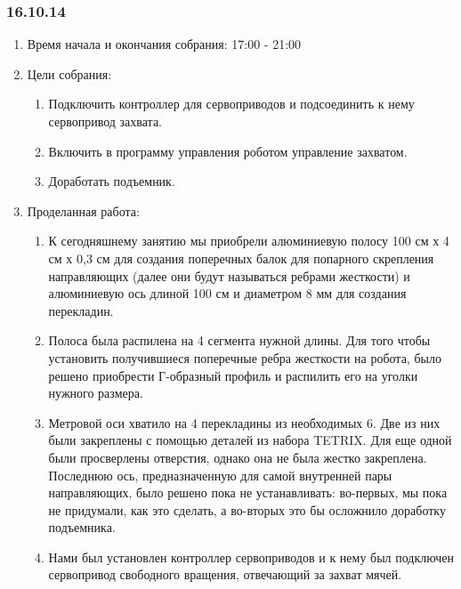 
\subsubsection{16.10.14}

\begin{enumerate}
	\item Время начала и окончания собрания:
	17:00 - 21:00
	\item Цели собрания:
	\begin{enumerate}
	  \item Подключить контроллер для сервоприводов и подсоединить к нему сервопривод захвата.
	  
	  \item Включить в программу управления роботом управление захватом.
	  
	  \item Доработать подъемник.
	  
    \end{enumerate}
	\item Проделанная работа:
	\begin{enumerate}
	  \item К сегодняшнему занятию мы приобрели алюминиевую полосу 100 см х 4 см х 0,3 см для создания поперечных балок для попарного скрепления направляющих (далее они будут называться ребрами жесткости) и алюминиевую ось длиной 100 см и диаметром 8 мм для создания перекладин.
      
      \item  Полоса была распилена на 4 сегмента нужной длины. Для того чтобы установить получившиеся поперечные ребра жесткости на робота, было решено приобрести Г-образный профиль и распилить его на уголки нужного размера.
      
      \item  Метровой оси хватило на 4 перекладины из необходимых 6. Две из них были закреплены с помощью деталей из набора TETRIX. Для еще одной были просверлены отверстия, однако она не была жестко закреплена. Последнюю ось, предназначенную для самой внутренней пары направляющих, было решено пока не устанавливать: во-первых, мы пока не придумали, как это сделать, а во-вторых это бы осложнило доработку подъемника.
      
      \item   Нами был установлен контроллер сервоприводов и к нему был подключен сервопривод свободного вращения, отвечающий за захват мячей.
      

\end{enumerate}
\end{enumerate}

